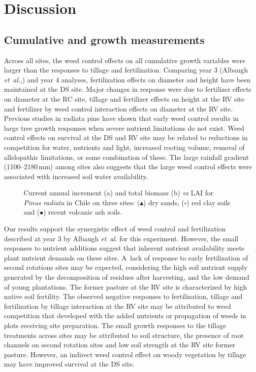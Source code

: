 \documentclass[final]{foresj}
\begin{document}
\section{Discussion}

\subsection{Cumulative and growth measurements}

Across all sites, the weed control effects on all
cumulative growth variables were larger than the responses
to tillage and fertilization. Comparing year 3 (Albaugh
\textit{et~al.},\cite{32}) and year 4 analyses,
fertilization effects on diameter and height have been
maintained at the DS site. Major changes in response were
due to fertilizer effects on diameter at the RC site,
tillage and fertilizer effects on height at the RV site and
fertilizer by weed control interaction effects on diameter
at the RV site. Previous studies in radiata pine have shown
that early weed control results in large tree growth
responses when severe nutrient limitations do not
exist.\cite{47,48,49,50} Weed control effects on survival
at the DS and RV site may be related to reductions in
competition for water, nutrients and light, increased
rooting volume, removal of allelopathic limitations, or
some combination of these.\cite{50,51} The large rainfall
gradient (1100--2180\,mm) among sites also suggests that
the large weed control effects were associated with
increased soil water availability.\cite{27,52}

\begin{figure}[]
\caption{Current annual increment (a) and total biomass (b) \textit{vs} LAI for \textit{Pinus radiata} in Chile on
three sites: ($\blacktriangle$) dry sands, ($\square$) red clay soils and ($\bullet$)
recent volcanic ash soils.\label{fig2}}\vskip-5pt
\end{figure}


Our results support the synergistic effect of weed control
and fertilization described at year 3 by Albaugh
\textit{et~al}.\cite{32} for this experiment. However, the
small responses to nutrient additions suggest that inherent
nutrient availability meets plant nutrient demands on these
sites. A~lack of response to early fertilization of second
rotations sites may be expected, considering the high soil
nutrient supply generated by the decomposition of residues
after harvesting,\cite{53} and the low demand of young
plantations.\cite{54,55,56} The former pasture at the RV
site is characterized by high native soil fertility. The
observed negative responses to fertilization, tillage and
fertilization by tillage interaction at the RV site may be
attributed to weed competition that developed with the
added nutrients\cite{57} or propagation of weeds in plots
receiving site preparation. The small growth responses to
the tillage treatments across sites may be attributed to
soil structure, the presence of root channels on second
rotation sites and low soil strength at the RV site former
pasture.\cite{36,38,58} However, an indirect weed control
effect on woody vegetation by tillage may have improved
survival at the DS site.
\end{document}
